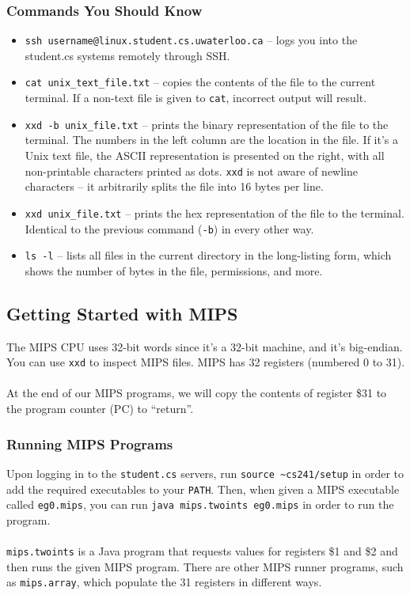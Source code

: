 \documentclass[]{article}
\theoremstyle{definition}
\begin{document}
			\subsubsection{Commands You Should Know}
				\begin{itemize}
					\item \verb+ssh username@linux.student.cs.uwaterloo.ca+ -- logs you into the student.cs systems remotely through SSH.
					\item \verb+cat unix_text_file.txt+ -- copies the contents of the file to the current terminal. If a non-text file is given to \verb+cat+, incorrect output will result.
					\item \verb+xxd -b unix_file.txt+ -- prints the binary representation of the file to the terminal. The numbers in the left column are the location in the file. If it's a Unix text file, the ASCII representation is presented on the right, with all non-printable characters printed as dots. \verb+xxd+ is not aware of newline characters -- it arbitrarily splits the file into 16 bytes per line.
					\item \verb+xxd unix_file.txt+ -- prints the hex representation of the file to the terminal. Identical to the previous command (\verb+-b+) in every other way.
					\item \verb+ls -l+ -- lists all files in the current directory in the long-listing form, which shows the number of bytes in the file, permissions, and more.
				\end{itemize}
		\subsection{Getting Started with MIPS}
			The MIPS CPU uses 32-bit words since it's a 32-bit machine, and it's big-endian. You can use \verb+xxd+ to inspect MIPS files. MIPS has 32 registers (numbered 0 to 31).
			\\ \\
			At the end of our MIPS programs, we will copy the contents of register \$31 to the program counter (PC) to ``return''.

			\subsubsection{Running MIPS Programs}
				Upon logging in to the \verb+student.cs+ servers, run \verb+source ~cs241/setup+ in order to add the required executables to your \verb+PATH+. Then, when given a MIPS executable called \verb+eg0.mips+, you can run \verb+java mips.twoints eg0.mips+ in order to run the program.
				\\ \\
				\verb+mips.twoints+ is a Java program that requests values for registers \$1 and \$2 and then runs the given MIPS program. There are other MIPS runner programs, such as \verb+mips.array+, which populate the 31 registers in different ways.
\end{document}
